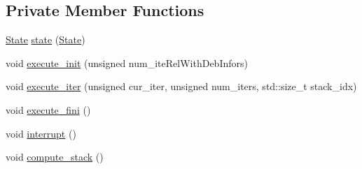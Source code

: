 \subsection*{Private Member Functions}
\begin{DoxyCompactItemize}
\item 
\hyperlink{classecto_1_1scheduler_a6b063d1c4bb9dad58d7ace61946b1200}{State} \hyperlink{classecto_1_1scheduler_a04cb7ea1040fcb02f5c843ca33ffa1a6}{state} (\hyperlink{classecto_1_1scheduler_a6b063d1c4bb9dad58d7ace61946b1200}{State})
\item 
void \hyperlink{classecto_1_1scheduler_adc21b65d6b046032648161c16ca89f77}{execute\-\_\-init} (unsigned num\-\_\-ite\-Rel\-With\-Deb\-Infors)
\item 
void \hyperlink{classecto_1_1scheduler_ae96db9aa735b4aec8eda6c1ea5616b95}{execute\-\_\-iter} (unsigned cur\-\_\-iter, unsigned num\-\_\-iters, std\-::size\-\_\-t stack\-\_\-idx)
\item 
void \hyperlink{classecto_1_1scheduler_abab4de26974143a076ac532ffac4f67f}{execute\-\_\-fini} ()
\item 
void \hyperlink{classecto_1_1scheduler_ae803a977a35883a6a0b8f83e7ba63d3c}{interrupt} ()
\item 
void \hyperlink{classecto_1_1scheduler_ad922a0a31e48a09ae6b6a95a4a1a20e5}{compute\-\_\-stack} ()
\end{DoxyCompactItemize}
